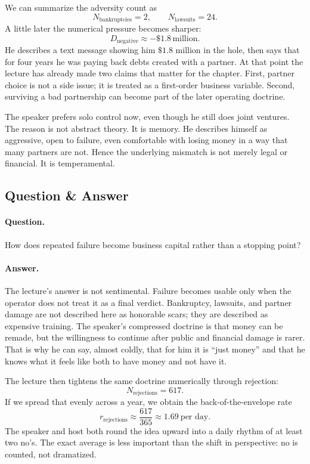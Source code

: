 We can summarize the adversity count as
\begin{equation}
N_{\text{bankruptcies}}=2,
\qquad
N_{\text{lawsuits}}=24.
\end{equation}
A little later the numerical pressure becomes sharper:
\begin{equation}
D_{\text{negative}}\approx -\$1.8\,\text{million}.
\end{equation}
He describes a text message showing him \(\$1.8\) million in the hole, then says that for four years he was paying back debts created with a partner. At that point the lecture has already made two claims that matter for the chapter. First, partner choice is not a side issue; it is treated as a first-order business variable. Second, surviving a bad partnership can become part of the later operating doctrine.

The speaker prefers solo control now, even though he still does joint ventures. The reason is not abstract theory. It is memory. He describes himself as aggressive, open to failure, even comfortable with losing money in a way that many partners are not. Hence the underlying mismatch is not merely legal or financial. It is temperamental.

\subsection{Question \& Answer}

\paragraph{Question.}
How does repeated failure become business capital rather than a stopping point?

\paragraph{Answer.}
The lecture's answer is not sentimental. Failure becomes usable only when the operator does not treat it as a final verdict. Bankruptcy, lawsuits, and partner damage are not described here as honorable scars; they are described as expensive training. The speaker's compressed doctrine is that money can be remade, but the willingness to continue after public and financial damage is rarer. That is why he can say, almost coldly, that for him it is ``just money'' and that he knows what it feels like both to have money and not have it.

The lecture then tightens the same doctrine numerically through rejection:
\begin{equation}
N_{\text{rejections}}=617.
\end{equation}
If we spread that evenly across a year, we obtain the back-of-the-envelope rate
\begin{equation}
r_{\text{rejections}}
\approx
\frac{617}{365}
\approx
1.69\ \text{per day}.
\end{equation}
The speaker and host both round the idea upward into a daily rhythm of at least two no's. The exact average is less important than the shift in perspective: no is counted, not dramatized.

